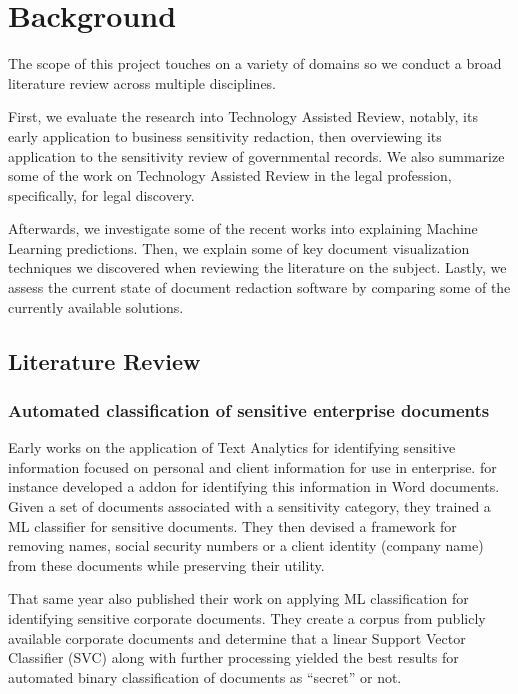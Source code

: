 \documentclass[\version]{l4proj}
\begin{document}
\chapter{Background}

The scope of this project touches on a variety of domains so we conduct a broad literature review across multiple disciplines.

First, we evaluate the research into Technology Assisted Review, notably, its early application to business sensitivity redaction, then overviewing its application to the sensitivity review of governmental records.
We also summarize some of the work on Technology Assisted Review in the legal profession, specifically, for legal discovery.

Afterwards, we investigate some of the recent works into explaining Machine Learning predictions.
Then, we explain some of key document visualization techniques we discovered when reviewing the literature on the subject.
Lastly, we assess the current state of document redaction software by comparing some of the currently available solutions.

\section{Literature Review}\label{section:lit_review}

\subsection{Automated classification of sensitive enterprise documents}

Early works on the application of Text Analytics for identifying sensitive information focused on personal and client information for use in enterprise.
\textcite{cumbyMachineLearningBased2011} for instance developed a addon for identifying this information in Word documents.
Given a set of documents associated with a sensitivity category, they trained a ML classifier for sensitive documents.
They then devised a framework for removing names, social security numbers or a client identity (company name) from these documents while preserving their utility.

That same year \textcite{hartTextClassificationData2011} also published their work on applying ML classification for identifying sensitive corporate documents.
They create a corpus from publicly available corporate documents and determine that a linear Support Vector Classifier (SVC) along with further processing yielded the best results for automated binary classification of documents as ``secret'' or not.
\end{document}
